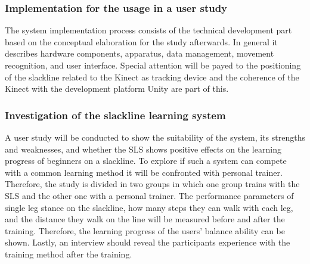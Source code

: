 \subsubsection{Implementation for the usage in a user study}
The system implementation process consists of the technical development part based on the conceptual elaboration for the study afterwards.
In general it describes hardware components, apparatus, data management, movement recognition, and user interface.
Special attention will be payed to the positioning of the slackline related to the Kinect as tracking device and the coherence of the Kinect with the development platform Unity are part of this.

\subsubsection{Investigation of the slackline learning system}
A user study will be conducted to show the suitability of the system, its strengths and weaknesses, and whether the SLS shows positive effects on the learning progress of beginners on a slackline.
To explore if such a system can compete with a common learning method it will be confronted with personal trainer.
Therefore, the study is divided in two groups in which one group trains with the SLS and the other one  with a personal trainer.
The performance parameters of single leg stance on the slackline, how many steps they can walk with each leg, and the distance they walk on the line will be measured before and after the training.
Therefore, the learning progress of the users' balance ability can be shown.
Lastly, an interview should reveal the participants experience with the training method after the training.



